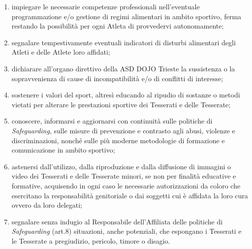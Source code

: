 \documentclass{djtsdoc}
\begin{document}
\begin{enumerate}
\begin{enumerate}
			\item impiegare le necessarie competenze professionali nell'eventuale programmazione e/o gestione 	di regimi alimentari in ambito sportivo, ferma restando la possibilità per ogni Atleta di	provvedervi autonomamente;
			\item segnalare tempestivamente eventuali indicatori di disturbi alimentari degli Atleti e delle Atlete loro affidati;
			\item dichiarare all'organo direttivo della ASD DOJO Trieste la sussistenza o la sopravvenienza di	cause di incompatibilità e/o di conflitti di interesse;
			\item sostenere i valori del sport, altresì educando al ripudio di sostanze o metodi vietati per alterare le prestazioni sportive dei Tesserati e delle Tesserate;
			\item conoscere, informarsi e aggiornarsi con continuità sulle politiche di \textit{Safeguarding}, sulle misure di prevenzione e contrasto agli abusi, violenze e discriminazioni, nonché sulle più moderne metodologie di formazione e comunicazione in ambito sportivo;
			\item astenersi dall'utilizzo, dalla riproduzione e dalla diffusione di immagini o video dei Tesserati e delle Tesserate minori, se non per finalità educative e formative, acquisendo in ogni caso le 	necessarie autorizzazioni da coloro che esercitano la responsabilità genitoriale o dai soggetti cui è affidata la loro cura ovvero da loro delegati;
			\item segnalare senza indugio al Responsabile dell'Affiliata delle politiche di \textit{Safeguarding} (art.8) situazioni, anche potenziali, che espongano i Tesserati e le Tesserate a pregiudizio, pericolo, timore o disagio.
		\end{enumerate}
	\end{enumerate}
	
\end{document}
